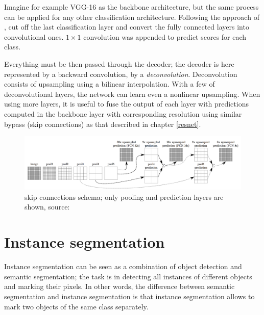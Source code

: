 Imagine for example VGG-16 as the backbone architecture, but the same process can be applied for any other classification architecture. Following the approach of \cite{fcns}, cut off the last classification layer and convert the fully connected layers into convolutional ones. $1 \times 1$ convolution was appended to predict scores for each class. 

Everything must be then passed through the decoder; the decoder is here represented by a backward convolution, by a \textit{deconvolution}. Deconvolution consists of upsampling using a bilinear interpolation. With a few of deconvolutional layers, the network can learn even a nonlinear upsampling. When using more layers, it is useful to fuse the output of each layer with predictions computed in the backbone layer with corresponding resolution using similar bypass (skip connections) as that described in chapter \ref{resnet}.

\begin{figure}[H]
   \centering
	\includegraphics[width=\linewidth]{./pictures/fcns-bypass.png}
	\caption[Bypass in Fully convolutional network]{ skip connections schema; only pooling and prediction layers are shown, source: \cite{fcns}}
      \label{fig:fcns-bypass}
\end{figure}


\section{Instance segmentation}
\label{instance-segmentation}

Instance segmentation can be seen as a combination of object detection and semantic segmentation; the task is in detecting all instances of different objects and marking their pixels. In other words, the difference between semantic segmentation and instance segmentation is that instance segmentation allows to mark two objects of the same class separately.

